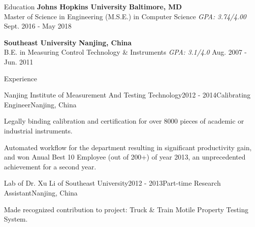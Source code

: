 \documentclass{resume} %
\begin{document}

\begin{rSection}{Education}
{\bf Johns Hopkins University} \hfill {\bf Baltimore, MD} \\
{Master of Science in Engineering (M.S.E.) in Computer Science} {\em GPA: 3.74/4.00} \hfill {Sept. 2016 - May 2018}

{\bf Southeast University} \hfill {\bf Nanjing, China} \\
{B.E. in Measuring Control Technology \& Instruments} {\em GPA: 3.1/4.0} \hfill {Aug. 2007 - Jun. 2011}
\end{rSection}



\begin{rSection}{Experience}

\begin{rSubsection}{Nanjing Institute of Measurement And Testing Technology}{2012 - 2014}{Calibrating Engineer}{Nanjing, China}
\item Legally binding calibration and certification for over 8000 pieces of academic or industrial instruments.
\item Automated workflow for the department resulting in significant productivity gain, and won Anual Best 10 Employee (out of 200+) of year 2013, an unprecedented achievement for a second year.
\end{rSubsection}

\begin{rSubsection}{Lab of Dr. Xu Li of Southeast University}{2012 - 2013}{Part-time Research Assistant}{Nanjing, China}
\item Made recognized contribution to project: Truck \& Train Motile Property Testing System.
\end{rSubsection}
\end{rSection}
\end{document}
